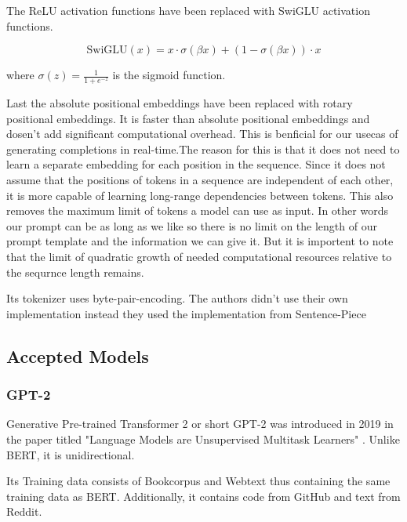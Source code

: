 The ReLU activation functions have been replaced with SwiGLU activation functions.


\begin{equation}
\text{SwiGLU}(x) = x \cdot \sigma(\beta x) + (1 - \sigma(\beta x)) \cdot x
\end{equation}

where \(\sigma(z) = \frac{1}{1 + e^{-z}}\) is the sigmoid function.

Last the absolute positional embeddings have been replaced with rotary positional embeddings. It is faster than absolute positional embeddings and dosen't add significant computational overhead. This is benficial for our usecas of generating completions in real-time.The reason for this is that it does not need to learn  a separate embedding for each position in the sequence. Since it does not assume that the positions of tokens in a sequence are independent of each other, it is more capable of learning long-range dependencies between tokens. This also removes the maximum limit of tokens a model can use as input. In other words our prompt can be as long as we like so there is no limit on the length of our prompt template and the information we can give it. But it is importent to note that the limit of quadratic growth of needed computational resources 
relative to the sequrnce length remains.



Its tokenizer uses byte-pair-encoding\cite{touvron2023llama}. The authors didn't use their own implementation instead they used the implementation from Sentence-Piece \cite{kudo2018sentencepiece}






\subsection{Accepted Models}

\subsubsection{GPT-2}
Generative Pre-trained Transformer 2 or short GPT-2 was introduced in 2019 in the paper titled "Language Models are Unsupervised Multitask Learners"\cite{Radford2019LanguageMA} . Unlike BERT, it is unidirectional.

Its Training data consists of Bookcorpus and Webtext thus containing the same training data as BERT. Additionally, it contains code from GitHub and text from Reddit.


